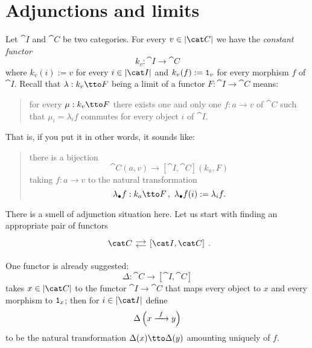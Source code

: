 
\section{Adjunctions and limits}

Let \(\cat I\) and \(\cat C\) be two categories. For every \(v \in \obj{\cat C}\) we have the {\em constant functor}
\[k_v : \cat I \to \cat C\]
where \(k_v(i) := v\) for every \(i \in \obj{\cat I}\) and \(k_v(f) := \mathtt 1_v\) for every morphism \(f\) of \(\cat I\). Recall that \(\lambda : k_v \tto F\) being a limit of a functor \(F : \cat I \to \cat C\) means:
\begin{quotation}
for every \(\mu : k_v \tto F\) there exists one and only one \(f : a \to v\) of \(\cat C\) such that \(\mu_i = \lambda_i f\)
commutes for every object \(i\) of \(\cat I\).
\end{quotation}
That is, if you put it in other words, it sounds like:
\begin{quotation}
there is a bijection
\[\cat C(a, v) \to [\cat I, \cat C](k_a, F)\]
taking \(f : a \to v\) to the natural transformation
\[\lambda_\bullet f : k_a \tto F\,, \ \lambda_\bullet f (i):= \lambda_i f .\]
\end{quotation}

There is a smell of adjunction situation here. Let us start with finding an appropriate pair of functors
\[\begin{tikzcd}[column sep=small] \cat C \ar[r, shift left] & {[\cat I, \cat C]} \ar[l, shift left] \end{tikzcd} .\]

One functor is already suggested:
\[\Delta : \cat C \to [\cat I, \cat C]\]
takes \(x \in \obj{\cat C}\) to the functor \(\cat I \to \cat C\) that maps every object to \(x\) and every morphism to \(\mathtt 1_x\); then for \(i \in \obj{\cat I}\) define
\[\Delta \left(x \xrightarrow{\ f\ } y\right)\]
to be the natural transformation \(\Delta(x) \tto \Delta(y)\) amounting uniquely of \(f\).

